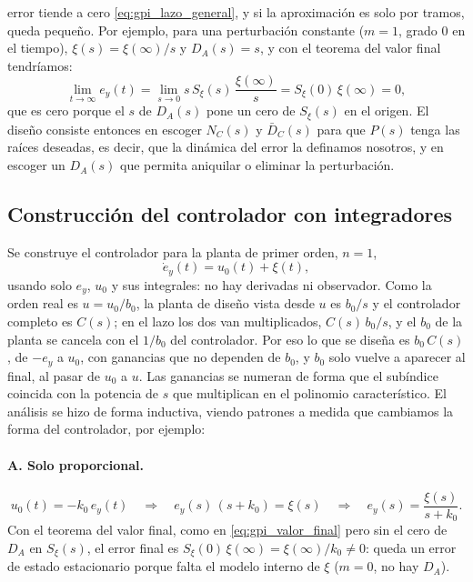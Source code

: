 error tiende a cero \eqref{eq:gpi_lazo_general}, y si la aproximación es solo por tramos, queda
pequeño. Por ejemplo, para una perturbación constante ($m = 1$, grado $0$ en el tiempo),
$\xi(s) = \xi(\infty)/s$ y $D_A(s) = s$, y con el teorema del valor final tendríamos:
\begin{equation}
\lim_{t\to\infty} e_y(t) = \lim_{s\to 0} s\,S_{\xi}(s)\,\frac{\xi(\infty)}{s}
= S_{\xi}(0)\,\xi(\infty) = 0 ,
\label{eq:gpi_valor_final}
\end{equation}
que es cero porque el $s$ de $D_A(s)$ pone un cero de $S_{\xi}(s)$ en el origen. El diseño
consiste entonces en escoger $N_C(s)$ y $\bar{D}_C(s)$ para que $P(s)$ tenga las raíces
deseadas, es decir, que la dinámica del error la definamos nosotros, y en escoger un $D_A(s)$ que
permita aniquilar o eliminar la perturbación.

\subsection{Construcción del controlador con integradores}
\label{subsec:gpi_integradores}
Se construye el controlador para la planta de primer orden, $n = 1$,
\begin{equation}
\dot{e}_y(t) = u_0(t) + \xi(t) ,
\label{eq:gpi_planta}
\end{equation}
usando solo $e_y$, $u_0$ y sus integrales: no hay derivadas ni observador. Como la orden
real es $u = u_0/b_0$, la planta de diseño vista desde $u$ es $b_0/s$ y el controlador completo
es $C(s)$; en el lazo los dos van multiplicados, $C(s)\,b_0/s$, y el $b_0$ de la planta se
cancela con el $1/b_0$ del controlador. Por eso lo que se diseña es $b_0\,C(s)$, de $-e_y$ a
$u_0$, con ganancias que no dependen de $b_0$, y $b_0$ solo vuelve a aparecer al final, al
pasar de $u_0$ a $u$. Las ganancias se numeran de forma que el subíndice coincida con la potencia de $s$
que multiplican en el polinomio característico. El análisis se hizo de forma inductiva,
viendo patrones a medida que cambiamos la forma del controlador, por ejemplo:

\paragraph{A. Solo proporcional.}
\begin{equation}
u_0(t) = -k_0\,e_y(t)
\quad\Longrightarrow\quad
e_y(s)\,(s + k_0) = \xi(s)
\quad\Longrightarrow\quad
e_y(s) = \frac{\xi(s)}{s + k_0} .
\end{equation}
Con el teorema del valor final, como en \eqref{eq:gpi_valor_final} pero sin el
cero de $D_A$ en $S_{\xi}(s)$, el error final es $S_{\xi}(0)\,\xi(\infty) = \xi(\infty)/k_0 \neq 0$:
queda un error de estado estacionario porque falta el modelo interno de $\xi$
($m = 0$, no hay $D_A$).

